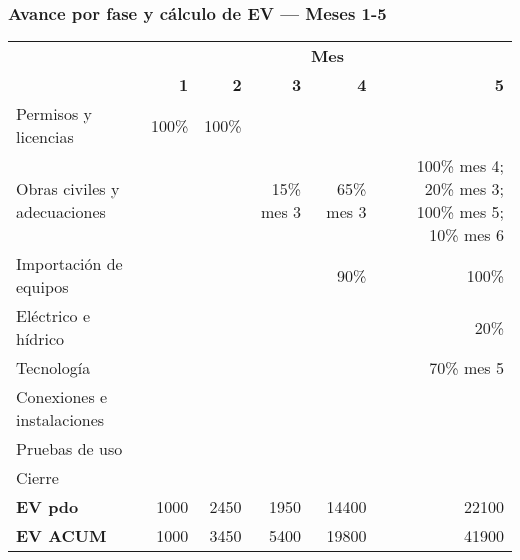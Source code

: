 \subsubsection*{Avance por fase y cálculo de EV — Meses 1-5}
\begin{table}[H]\centering\small
\begin{tabular}{lrrrrr}
\toprule
 & \multicolumn{5}{c}{\textbf{Mes}} \\
\cmidrule(lr){2-6}
 & \textbf{1} & \textbf{2} & \textbf{3} & \textbf{4} & \textbf{5} \\
\midrule
Permisos y licencias         & 100\% & 100\% &      &             &                           \\
Obras civiles y adecuaciones &       &       & 15\% mes 3 & 65\% mes 3 & 100\% mes 4; 20\% mes 3; 100\% mes 5; 10\% mes 6 \\
Importación de equipos       &       &       &            & 90\%       & 100\% \\
Eléctrico e hídrico          &       &       &            &            & 20\%  \\
Tecnología                   &       &       &            &            & 70\% mes 5 \\
Conexiones e instalaciones   &       &       &            &            &      \\
Pruebas de uso               &       &       &            &            &      \\
Cierre                       &       &       &            &            &      \\
\midrule
\textbf{EV pdo}  & 1000 & 2450 & 1950 & 14400 & 22100 \\
\textbf{EV ACUM} & 1000 & 3450 & 5400 & 19800 & 41900 \\
\bottomrule
\end{tabular}
\end{table}

